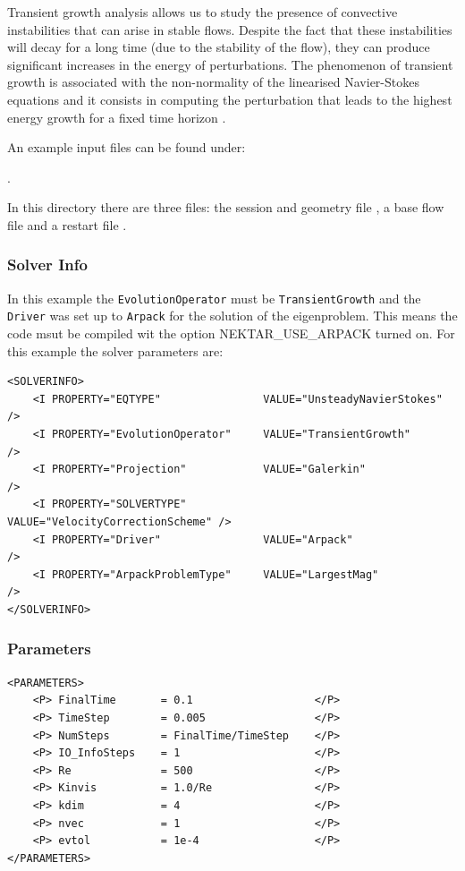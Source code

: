 Transient growth analysis allows us to study the presence of
convective instabilities that can arise in stable flows. Despite the
fact that these instabilities will decay for a long time (due to the
stability of the flow), they can produce significant increases in the
energy of perturbations. The phenomenon of transient growth is
associated with the non-normality of the linearised Navier-Stokes
equations and it consists in computing the perturbation that leads to
the highest energy growth for a fixed time horizon \cite{BiGlobal}.

An example input files can be found under:

.

In this directory there are three files: the session and geometry file
, a base flow file
 and a restart file
.

\subsubsection*{Solver Info}

In this example the \texttt{EvolutionOperator} must be
\texttt{TransientGrowth} and the \texttt{Driver} was set up to
\texttt{Arpack} for the solution of the eigenproblem. This means the
code msut be compiled wit the option NEKTAR\_USE\_ARPACK turned
on. For this example the solver parameters are:

      \begin{lstlisting}[style=XMLStyle]
<SOLVERINFO>
    <I PROPERTY="EQTYPE"                VALUE="UnsteadyNavierStokes"     />
    <I PROPERTY="EvolutionOperator"     VALUE="TransientGrowth"          />
    <I PROPERTY="Projection"            VALUE="Galerkin"                 />
    <I PROPERTY="SOLVERTYPE"            VALUE="VelocityCorrectionScheme" />
    <I PROPERTY="Driver"                VALUE="Arpack"                   />
    <I PROPERTY="ArpackProblemType"     VALUE="LargestMag"               />
</SOLVERINFO>
  \end{lstlisting}


\subsubsection*{Parameters}

 \begin{lstlisting}[style=XMLStyle]
<PARAMETERS>
    <P> FinalTime       = 0.1                   </P>
    <P> TimeStep        = 0.005                 </P>
    <P> NumSteps        = FinalTime/TimeStep    </P>
    <P> IO_InfoSteps    = 1                     </P>
    <P> Re              = 500                   </P>
    <P> Kinvis          = 1.0/Re                </P>
    <P> kdim            = 4                     </P>
    <P> nvec            = 1                     </P>
    <P> evtol           = 1e-4                  </P>
</PARAMETERS>
   \end{lstlisting}


